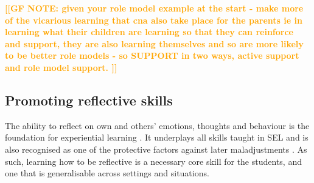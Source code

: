 \documentclass[prodmode,acmtochi]{acmsmall}
\newcommand{\Geraldine}[1]{\textrm{\textbf{\textcolor{Orange}{[[#1]]}}}}
\begin{document}
\Geraldine{GF NOTE: given your role model example at the start - make more of the vicarious learning that cna also take place for the parents ie in learning what their children are learning so that they can reinforce and support, they are also learning themselves and so are more likely to be better role models - so SUPPORT in two ways, active support and role model support. }








                 

\subsection{Promoting reflective skills}
\label{sec:feedback}
 
The ability to reflect on own and others' emotions, thoughts and behaviour is the foundation for experiential learning \cite{Moon1999}. It underplays all skills taught in SEL \cite{Cohen2001,Cohen2006,Pasi2001,Maree2007,CASEL2013} and is also recognised as one of the protective factors against later maladjustments \cite{Zins2004}. %
As such, learning how to be reflective is a necessary core skill for the students, and one that is generalisable across settings and situations. 
\end{document}
